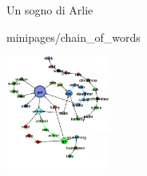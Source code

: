 \documentclass[xcolor=x11names,compress]{beamer}
\begin{document}
{
\begin{frame}[t]{Un sogno di Arlie}
    \vspace{-0.2cm}
    
    
     {minipages/chain_of_words}
    
    \begin{minipage}[t]{\textwidth}
        \hspace{-0.715cm}
        \includegraphics[width=0.25355637513\textwidth]{immagini/arlie_80_lv0}
    \end{minipage}
\end{frame}}
\end{document}
